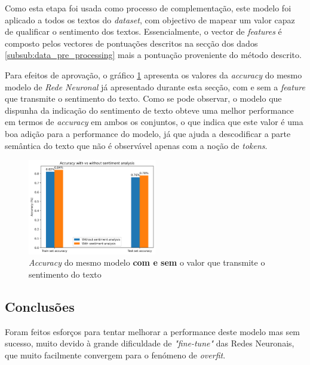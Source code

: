 Como esta etapa foi usada como processo de complementação, este modelo foi aplicado a todos os textos do \textit{dataset}, com objectivo de mapear um valor capaz de qualificar o sentimento dos textos. Essencialmente, o vector de \textit{features} é composto pelos vectores de pontuações descritos na secção dos dados  \ref{subsub:data_pre_processing} mais a pontuação proveniente do método descrito.

Para efeitos de aprovação, o gráfico \ref{diagram:Sentiment_vs_no_sentiments} apresenta os valores da \textit{accuracy} do mesmo modelo de \textit{Rede Neuronal} já apresentado durante esta secção, com e sem a \textit{feature} que transmite o sentimento do texto. Como se pode observar, o modelo que dispunha da indicação do sentimento de texto obteve uma melhor performance em termos de \textit{accuracy} em ambos os conjuntos, o que indica que este valor é uma boa adição para a performance do modelo, já que ajuda a descodificar a parte semântica do texto que não é observável apenas com a noção de \textit{tokens}.


\begin{figure}[!t]
\begin{center}
\includegraphics[width=0.5\textwidth,keepaspectratio]{figures/sentiment_vs_no_sentiment.png}
\caption{\textit{Accuracy} do mesmo modelo \textbf{com e sem} o valor que transmite o sentimento do texto}
\label{diagram:Sentiment_vs_no_sentiments}
\centering
\end{center}
\end{figure}



\subsection{Conclusões}
Foram feitos esforços para tentar melhorar a performance deste modelo mas sem sucesso, muito devido à grande dificuldade de \textit{"fine-tune"} das Redes Neuronais, que muito facilmente convergem para o fenómeno de \textit{overfit}.
